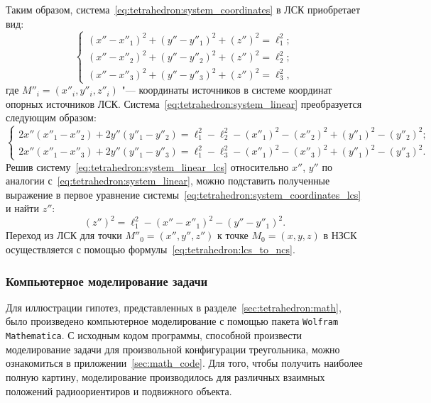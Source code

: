 \documentclass[../main.tex]{subfiles}
\begin{document}
Таким образом, система~\eqref{eq:tetrahedron:system_coordinates} в ЛСК приобретает вид:
\begin{equation}\label{eq:tetrahedron:system_coordinates_lcs}
  \begin{cases}
    \left(x'' - x''_1\right)^2 + \left(y'' - y''_1\right)^2 + \left(z''\right)^2 = \ell_1^2; \\
    \left(x'' - x''_2\right)^2 + \left(y'' - y''_2\right)^2 + \left(z''\right)^2 = \ell_2^2; \\
    \left(x'' - x''_3\right)^2 + \left(y'' - y''_3\right)^2 + \left(z''\right)^2 = \ell_3^2,
  \end{cases}
\end{equation}
где $M''_i = \left(x''_i, y''_i, z''_i\right)$ "--- координаты источников в системе координат опорных источников ЛСК. Система~\eqref{eq:tetrahedron:system_linear} преобразуется следующим образом:
\begin{equation}\label{eq:tetrahedron:system_linear_lcs}
  \begin{cases}
    2 x'' \left(x''_1 - x''_2\right) + 2 y'' \left(y''_1 - y''_2\right) = \ell_1^2 - \ell_2^2 - \left(x''_1\right)^2 - \left(x''_2\right)^2 + \left(y''_1\right)^2 - \left(y''_2\right)^2; \\
    2 x'' \left(x''_1 - x''_3\right) + 2 y'' \left(y''_1 - y''_3\right) = \ell_1^2 - \ell_3^2 - \left(x''_1\right)^2 - \left(x''_3\right)^2 + \left(y''_1\right)^2 - \left(y''_3\right)^2.
  \end{cases}
\end{equation}
Решив систему~\eqref{eq:tetrahedron:system_linear_lcs} относительно $x''$, $y''$ по аналогии с~\eqref{eq:tetrahedron:system_linear}, можно подставить полученные выражение в первое уравнение системы~\eqref{eq:tetrahedron:system_coordinates_lcs} и найти $z''$:
\begin{equation*}
  \left(z''\right)^2 = \ell_1^2 - \left(x'' - x''_1\right)^2 - \left(y'' - y''_1\right)^2.
\end{equation*}
Переход из ЛСК для точки $M''_0 = \left(x'', y'', z''\right)$ к точке $M_0 = \left(x, y, z\right)$ в НЗСК осуществляется с помощью формулы~\eqref{eq:tetrahedron:lcs_to_ncs}.

\subsubsection{Компьютерное моделирование задачи}
Для иллюстрации гипотез, представленных в разделе~\ref{sec:tetrahedron:math}, было произведено компьютерное моделирование с помощью пакета \texttt{Wolfram Mathematica}. С исходным кодом программы, способной произвести моделирование задачи для произвольной конфигурации треугольника, можно ознакомиться в приложении~\ref{sec:math_code}. Для того, чтобы получить наиболее полную картину, моделирование производилось для различных взаимных положений радиоориентиров и подвижного объекта.
\end{document}
